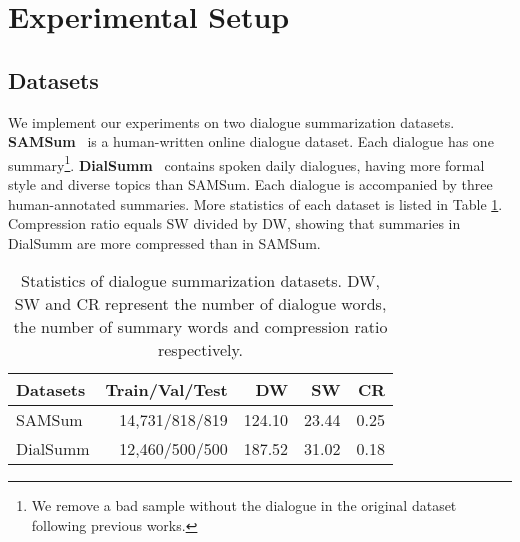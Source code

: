 \section{Experimental Setup}

\subsection{Datasets}
We implement our experiments on two dialogue summarization datasets.
\textbf{SAMSum}~\cite{gliwa2019samsum} is a human-written online dialogue dataset. Each dialogue has one summary\footnote{We remove a bad sample without the dialogue in the original dataset following previous works.}.
\textbf{DialSumm}~\cite{chen-etal-2021-dialogsum} contains spoken daily dialogues, having more formal style and diverse topics than SAMSum. Each dialogue is accompanied by three human-annotated summaries. More statistics of each dataset is listed in Table \ref{tab:sumdataset}. Compression ratio equals SW divided by DW, showing that summaries in DialSumm are more compressed than in SAMSum.

\begin{table}
	\small
	\centering
	\begin{tabular}{lrrrr}
		\toprule[1pt]
		\textbf{Datasets} & \textbf{Train/Val/Test} & \textbf{DW} & \textbf{SW} & \textbf{CR} \\
		\midrule[1pt]
		{SAMSum} & 14,731/818/819 & 124.10 & 23.44 & 0.25\\
		{DialSumm} & 12,460/500/500 & 187.52 & 31.02 & 0.18 \\
		\bottomrule[1pt]
	\end{tabular}
	\caption{Statistics of dialogue summarization datasets. DW, SW and CR represent the number of dialogue words, the number of summary words and compression ratio respectively.}
	\label{tab:sumdataset}
\end{table}

